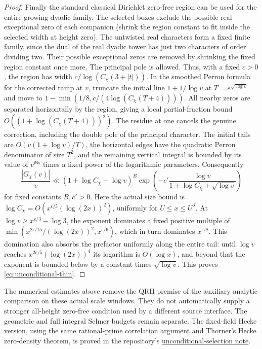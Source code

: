 \begin{proof}
Finally the standard classical Dirichlet zero-free region can be used
for the entire growing dyadic family. The selected boxes exclude
the possible real exceptional zero of each companion (shrink the
region constant to fit inside the selected width at height zero).
The untwisted real characters form a fixed finite family, since the
dual of the real dyadic tower has just two characters of order
dividing two. Their possible exceptional zeros are removed by
shrinking the fixed region constant once more. The principal pole
is allowed. Thus, with a fixed \(c>0\), the region has width
\(c/\log(C_\chi(3+|t|))\).
In the smoothed Perron formula for the corrected ramp at \(v\),
truncate the initial line \(1+1/\log v\) at
\(T=e^{\sqrt{\log v}}\) and move to
\(1-\min(1/8,c/(4\log(C_\chi(T+4))))\).
All nearby zeros are separated horizontally by the region, giving
a local partial-fraction bound \(O((1+\log(C_\chi(T+4)))^2)\).
The residue at one cancels the genuine correction, including the
double pole of the principal character. The initial tails are
\(O(v(1+\log v)/T)\), the horizontal edges have the quadratic
Perron denominator of size \(T^2\), and the remaining vertical
integral is bounded by its value of \(v^{\Re s}\) times a fixed
power of the logarithmic parameters. Consequently
\[
 \frac{|G_\chi(v)|}{v}\ll
 (1+\log C_\chi+\log v)^B
 \exp\left(-c'\frac{\log v}
                  {1+\log C_\chi+\sqrt{\log v}}\right)
\]
for fixed constants \(B,c'>0\).
Here the actual size bound is
\(\log C_\chi=O(x^{\epsilon/5}(\log(2x))^2)\),
uniformly for \(U\le x\le U^J\).
At \(\log v\ge x^{\epsilon/3}-\log3\), the exponent dominates
a fixed positive multiple of
\(\min(x^{2\epsilon/15}/(\log(2x))^2,x^{\epsilon/6})\),
which in turn dominates \(x^{\epsilon/8}\). This domination
also absorbs the prefactor uniformly along the entire tail:
until \(\log v\) reaches \(x^{2\epsilon/5}(\log(2x))^4\)
its logarithm is \(O(\log x)\), and beyond that the exponent
is bounded below by a constant times \(\sqrt{\log v}\).
This proves \eqref{eq:unconditional-thin}.
\end{proof}

\begin{remark}
The numerical estimates above remove the QRH premise of the
auxiliary analytic comparison on these actual scale windows.
They do not automatically supply a stronger all-height
zero-free condition used by a different source interface.
The geometric and full integral Selmer budgets remain separate.
The fixed-field Hecke version, using the same rational-prime
correlation argument and Thorner's Hecke zero-density theorem,
is proved in the repository's
\href{https://github.com/JoseBrox/GRH_distillation/blob/main/notes/unconditional-quadratic-selection.md}
{unconditional-selection note}.
\end{remark}
